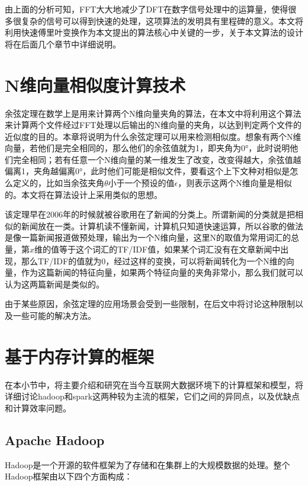 由上面的分析可知，FFT大大地减少了DFT在数字信号处理中的运算量，使得很多很复杂的信号可以得到快速的处理，这项算法的发明具有里程碑的意义。本文将利用快速傅里叶变换作为本文提出的算法核心中关键的一步，关于本文算法的设计将在后面几个章节中详细说明。

\section{N维向量相似度计算技术}

余弦定理在数学上是用来计算两个N维向量夹角的算法，在本文中将利用这个算法来计算两个文件经过FFT处理以后输出的N维向量的夹角，以达到判定两个文件的近似度的目的。本章将说明为什么余弦定理可以用来检测相似度。想象有两个N维向量，若他们是完全相同的，那么他们的余弦值就为1，即夹角为0°，此时说明他们完全相同；若有任意一个N维向量的某一维发生了改变，改变得越大，余弦值越偏离1，夹角越偏离0°，此时他们可能是相似文件，要看这个上下文种对相似是怎么定义的，比如当余弦夹角$\theta$小于一个预设的值$\epsilon$，则表示这两个N维向量是相似的。本文将在算法设计上采用类似的思想。

该定理早在2006年的时候就被谷歌用在了新闻的分类上。所谓新闻的分类就是把相似的新闻放在一类。计算机读不懂新闻，计算机只知道快速运算，所以谷歌的做法是像一篇新闻报道做预处理，输出为一个N维向量，这里N的取值为常用词汇的总量，第$x$维的值等于这个词汇的TF/IDF值，如果某个词汇没有在文章新闻中出现，那么TF/IDF的值就为0，经过这样的变换，可以将新闻转化为一个N维的向量，作为这篇新闻的特征向量，如果两个特征向量的夹角非常小，那么我们就可以认为这两篇新闻是类似的。

由于某些原因，余弦定理的应用场景会受到一些限制，在后文中将讨论这种限制以及一些可能的解决方法。

\section{基于内存计算的框架}
\label{sec:framework}
在本小节中，将主要介绍和研究在当今互联网大数据环境下的计算框架和模型，将详细讨论hadoop和spark这两种较为主流的框架，它们之间的异同点，以及优缺点和计算效率问题。

\subsection{Apache Hadoop}
Hadoop是一个开源的软件框架为了存储和在集群上的大规模数据的处理。整个Hadoop框架由以下四个方面构成：

